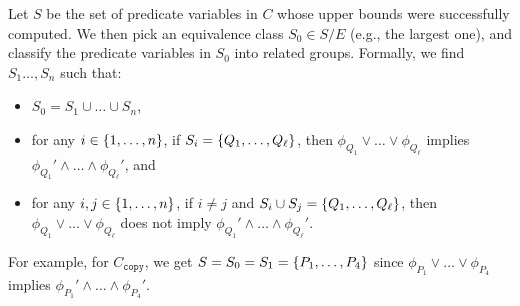 Let \(S\) be the set of predicate variables in \(C\) whose upper bounds 
were successfully computed.  We then pick an equivalence class \(S_0 \in 
S / E\) (e.g., the largest one), and classify the predicate variables in 
\(S_0\) into related groups.  %
%
Formally, we find \(S_1\dots,S_n\) such that:
\begin{itemize}
\item \(S_0 = S_1 \cup \dots \cup S_n\),
\item for any \(i \in \{{1,\dots,n}\}\), if \(S_i = 
\{{Q_1,\dots,Q_{\ell}}\}\), then \(\phi_{Q_1} \lor \dots \lor 
\phi_{Q_{\ell}}\) implies \(\phi_{Q_1}' \land \dots \land 
\phi_{Q_{\ell}}'\), and
\item for any \(i,j \in \{{1,\dots,n}\}\), if \(i \neq j\) and 
\(S_i \cup S_j = \{{Q_1,\dots,Q_{\ell}}\}\), then \(\phi_{Q_1} \lor 
\dots \lor \phi_{Q_{\ell}}\) does not imply \(\phi_{Q_1}' \land \dots 
\land \phi_{Q_{\ell}}'\).
\end{itemize}
For example, for \(C_{\texttt{copy}}\), we get 
\(S=S_0=S_1=\{{P_1,\dots,P_4}\}\) since \(\phi_{P_1} \lor \dots \lor 
\phi_{P_4}\) implies \(\phi_{P_1}' \land \dots \land \phi_{P_4}'\).

